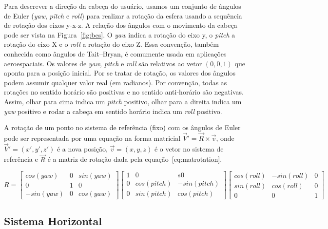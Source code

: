 Para descrever a direção da cabeça do usuário, usamos um conjunto de ângulos de Euler (\textit{yaw}, \textit{pitch} e \textit{roll}) para realizar a rotação da esfera usando a sequência de rotação dos eixos y-x-z. A relação dos ângulos com o movimento da cabeça pode ser vista na Figura~\ref{fig:bcs}. O \textit{yaw} indica a rotação do eixo y, o \textit{pitch} a rotação do eixo X e o \textit{roll} a rotação do eixo Z. Essa convenção, também conhecida como ângulos de Tait–Bryan, é comumente usada em aplicações aeroespaciais. Os valores de \textit{yaw}, \textit{pitch} e \textit{roll} são relativos ao vetor $(0, 0, 1)$ que aponta para a posição inicial. Por se tratar de rotação, os valores dos ângulos podem assumir qualquer valor real (em radianos). Por convenção, todas as rotações no sentido horário são positivas e no sentido anti-horário são negativas. Assim, olhar para cima indica um \textit{pitch} positivo, olhar para a direita indica um \textit{yaw} positivo e rodar a cabeça em sentido horário indica um \textit{roll} positivo.

A rotação de um ponto no sistema de referência (fixo) com os ângulos de Euler pode ser representada por uma equação na forma matricial $\overrightarrow{V}' = \overrightarrow{R} \times \overrightarrow{v}$, onde $\overrightarrow{V}' = (x',y',z')$ é a nova posição, $\overrightarrow{v} = (x,y,z)$ é o vetor no sistema de referência e $\overrightarrow{R}$ é a matriz de rotação dada pela equação~\ref{eq:matrotation}.


\begin{equation}
	R=\begin{bmatrix}
		cos(yaw) & 0 & sin(yaw)\\
		0 & 1 & 0\\
		-sin(yaw) & 0 & cos(yaw)
	\end{bmatrix}
	\begin{bmatrix}
		1 & 0 & s0\\
		0 & cos(pitch) & -sin(pitch)\\
		0 & sin(pitch) & cos(pitch)
	\end{bmatrix}
	\begin{bmatrix}
		cos(roll) & -sin(roll) & 0\\
		sin(roll) & cos(roll) & 0\\
		0 & 0 & 1
	\end{bmatrix}
	\label{eq:matrotation}
\end{equation}

\subsection{Sistema Horizontal}

